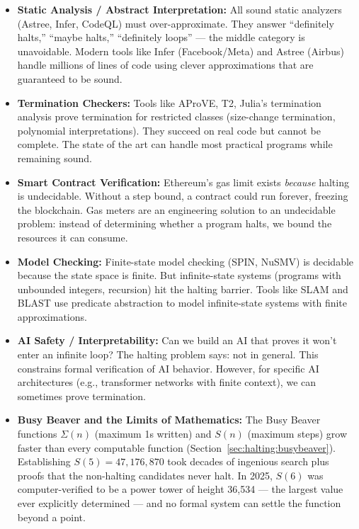 \begin{itemize}
\item \textbf{Static Analysis / Abstract Interpretation:} All sound static analyzers (Astree, Infer, CodeQL) must over-approximate. They answer ``definitely halts,'' ``maybe halts,'' ``definitely loops'' — the middle category is unavoidable. Modern tools like Infer (Facebook/Meta) and Astree (Airbus) handle millions of lines of code using clever approximations that are guaranteed to be sound.

\item \textbf{Termination Checkers:} Tools like AProVE, T2, Julia's termination analysis prove termination for restricted classes (size-change termination, polynomial interpretations). They succeed on real code but cannot be complete. The state of the art can handle most practical programs while remaining sound.

\item \textbf{Smart Contract Verification:} Ethereum's gas limit exists \emph{because} halting is undecidable. Without a step bound, a contract could run forever, freezing the blockchain. Gas meters are an engineering solution to an undecidable problem: instead of determining whether a program halts, we bound the resources it can consume.

\item \textbf{Model Checking:} Finite-state model checking (SPIN, NuSMV) is decidable because the state space is finite. But infinite-state systems (programs with unbounded integers, recursion) hit the halting barrier. Tools like SLAM and BLAST use predicate abstraction to model infinite-state systems with finite approximations.

\item \textbf{AI Safety / Interpretability:} Can we build an AI that proves it won't enter an infinite loop? The halting problem says: not in general. This constrains formal verification of AI behavior. However, for specific AI architectures (e.g., transformer networks with finite context), we can sometimes prove termination.

\item \textbf{Busy Beaver and the Limits of Mathematics:} The Busy Beaver functions $\Sigma(n)$ (maximum 1s written) and $S(n)$ (maximum steps) grow faster than every computable function (Section~\ref{sec:halting:busybeaver}). Establishing $S(5) = 47,\!176,\!870$ took decades of ingenious search plus proofs that the non-halting candidates never halt. In 2025, $S(6)$ was computer-verified to be a power tower of height 36,534 --- the largest value ever explicitly determined --- and no formal system can settle the function beyond a point.


\end{itemize}
